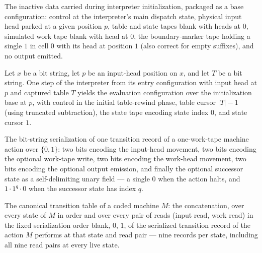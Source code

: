 \begin{definition}
\label{Turing.universalInterpreterBase}
\leanok
{}
The inactive data carried during interpreter initialization, packaged as a
base configuration: control at the interpreter's main dispatch state,
physical input head parked at a given position $p$, table and state tapes
blank with heads at $0$, simulated work tape blank with head at $0$, the
boundary-marker tape holding a single $1$ in cell $0$ with its head at
position $1$ (also correct for empty suffixes), and no output emitted.
\end{definition}

\begin{lemma}
\label{Turing.universalInterpreter_first}
\leanok
{}
Let $x$ be a bit string, let $p$ be an input-head position on $x$, and let $T$ be a bit
string. One step of the interpreter from its entry configuration with input head at $p$
and captured table $T$ yields the evaluation configuration over the initialization base
at $p$, with control in the initial table-rewind phase, table cursor $|T|-1$ (using
truncated subtraction), the state tape encoding state index $0$, and state cursor $1$.
\end{lemma}

\begin{definition}
\label{Turing.universalRecordBits}
\leanok
{}
The bit-string serialization of one transition record of a one-work-tape
machine action over $\{0,1\}$: two bits encoding the input-head movement, two
bits encoding the optional work-tape write, two bits encoding the work-head
movement, two bits encoding the optional output emission, and finally the
optional successor state as a self-delimiting unary field --- a single $0$
when the action halts, and $1 \cdot 1^{q} \cdot 0$ when the successor state
has index $q$.
\end{definition}

\begin{definition}
\label{Turing.universalRecords}
\leanok
{}
The canonical transition table of a coded machine $M$: the concatenation,
over every state of $M$ in order and over every pair of reads (input read,
work read) in the fixed serialization order blank, $0$, $1$, of the
serialized transition record of the action $M$ performs at that state and
read pair --- nine records per state, including all nine read pairs at every
live state.
\end{definition}

